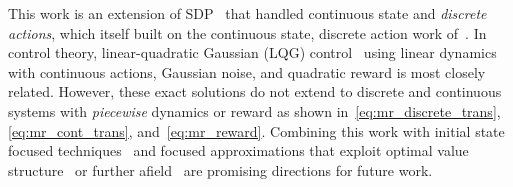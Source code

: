 This work is an extension of SDP~\cite{sanner_uai11} that handled
continuous state and \emph{discrete actions}, which itself built on the
continuous state, discrete action work of~\cite{boyan01,feng04,li05}.
In control theory, linear-quadratic Gaussian (LQG) control~\cite{lqgc}
using linear dynamics with continuous actions, Gaussian noise, and quadratic
reward is most closely related.  However, these exact solutions do
not extend to discrete and continuous systems with \emph{piecewise}
dynamics or reward as shown in~\eqref{eq:mr_discrete_trans},
\eqref{eq:mr_cont_trans}, and~\eqref{eq:mr_reward}.
%
Combining this work with initial state focused techniques~\cite{hao09}
and focused approximations that exploit optimal value
structure~\cite{apricodd} or further
afield~\cite{munos02,kveton06,phase07} are promising directions for
future work.

